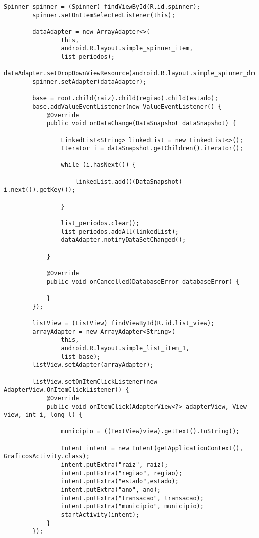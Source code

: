 \documentclass[12pt,a4paper]{article}
\begin{document}
\begin{lstlisting}[caption=./mobile/src/main/java/app/transparenciaeducativa/ListMunicipiosActivity.java]
        Spinner spinner = (Spinner) findViewById(R.id.spinner);
        spinner.setOnItemSelectedListener(this);

        dataAdapter = new ArrayAdapter<>(
                this,
                android.R.layout.simple_spinner_item,
                list_periodos);
        dataAdapter.setDropDownViewResource(android.R.layout.simple_spinner_dropdown_item);
        spinner.setAdapter(dataAdapter);

        base = root.child(raiz).child(regiao).child(estado);
        base.addValueEventListener(new ValueEventListener() {
            @Override
            public void onDataChange(DataSnapshot dataSnapshot) {

                LinkedList<String> linkedList = new LinkedList<>();
                Iterator i = dataSnapshot.getChildren().iterator();

                while (i.hasNext()) {

                    linkedList.add(((DataSnapshot) i.next()).getKey());

                }

                list_periodos.clear();
                list_periodos.addAll(linkedList);
                dataAdapter.notifyDataSetChanged();

            }

            @Override
            public void onCancelled(DatabaseError databaseError) {

            }
        });

        listView = (ListView) findViewById(R.id.list_view);
        arrayAdapter = new ArrayAdapter<String>(
                this,
                android.R.layout.simple_list_item_1,
                list_base);
        listView.setAdapter(arrayAdapter);

        listView.setOnItemClickListener(new AdapterView.OnItemClickListener() {
            @Override
            public void onItemClick(AdapterView<?> adapterView, View view, int i, long l) {

                municipio = ((TextView)view).getText().toString();

                Intent intent = new Intent(getApplicationContext(), GraficosActivity.class);
                intent.putExtra("raiz", raiz);
                intent.putExtra("regiao", regiao);
                intent.putExtra("estado",estado);
                intent.putExtra("ano", ano);
                intent.putExtra("transacao", transacao);
                intent.putExtra("municipio", municipio);
                startActivity(intent);
            }
        });


\end{lstlisting}
\end{document}
